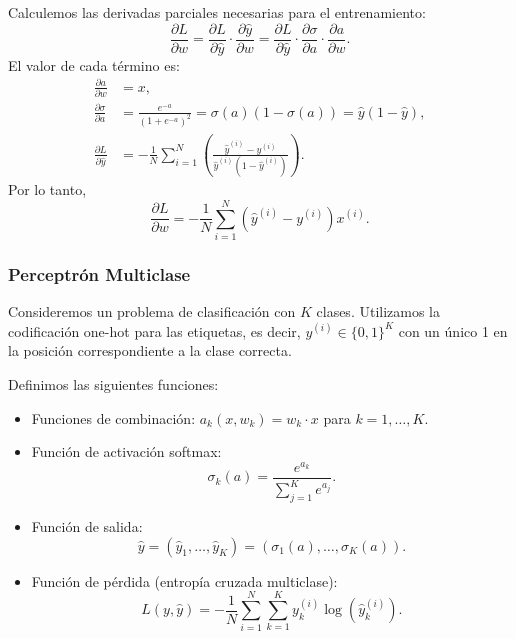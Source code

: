 \documentclass[a4,11pt]{aleph-notas}
\begin{document}
Calculemos las derivadas parciales necesarias para el entrenamiento:
\[
    \frac{\partial L}{\partial w} 
    = \frac{\partial L}{\partial \hat y} \cdot \frac{\partial \hat y}{\partial w}
    = \frac{\partial L}{\partial \hat y} \cdot \frac{\partial \sigma}{\partial a} \cdot \frac{\partial a}{\partial w}.
\]
El valor de cada término es:
\begin{align*}
    \frac{\partial a}{\partial w} &= x, \\
    \frac{\partial \sigma}{\partial a} &= \frac{e^{-a}}{(1 + e^{-a})^2} = \sigma(a)(1 - \sigma(a)) = \hat y (1 - \hat y), \\
    \frac{\partial L}{\partial \hat y} &= -\frac{1}{N} \sum_{i=1}^N \left( \frac{\hat y^{(i)} - y^{(i)}}{\hat y^{(i)} (1 - \hat y^{(i)})} \right).
\end{align*}
Por lo tanto,
\[
    \frac{\partial L}{\partial w}
    = -\frac{1}{N} \sum_{i=1}^N (\hat y^{(i)} - y^{(i)}) x^{(i)}.
\]

\subsubsection*{Perceptrón Multiclase}

Consideremos un problema de clasificación con \(K\) clases. Utilizamos la codificación one-hot para las etiquetas, es decir, \(y^{(i)} \in \{0,1\}^K\) con un único 1 en la posición correspondiente a la clase correcta.

Definimos las siguientes funciones:
\begin{itemize}
    \item Funciones de combinación: \(a_k(x,w_k) = w_k\cdot x\) para \(k = 1, \ldots, K\).
    \item Función de activación softmax:
    \[
        \sigma_k(a) = \frac{e^{a_k}}{\sum_{j=1}^K e^{a_j}}.
    \]
    \item Función de salida: 
    \[
        \hat y = (\hat y_1, \ldots, \hat y_K) = (\sigma_1(a), \ldots, \sigma_K(a)).
    \]
    \item Función de pérdida (entropía cruzada multiclase):
    \[
        L(y,\hat y) = -\frac{1}{N} \sum_{i=1}^N \sum_{k=1}^K y_k^{(i)} \log(\hat y_k^{(i)}).
    \]
\end{itemize}
\end{document}

